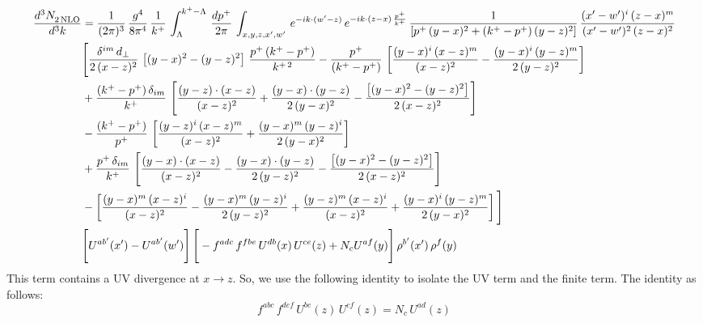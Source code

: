 \documentclass[9pt]{article}
\numberwithin{equation}{section}
\begin{document}
\begin{align}
    \frac{d^{3}N_{2\,\rm NLO}^{\rm}}{d^{3}k}  & =  \frac{1}{(2\pi)^{3}}\, \frac{g^{4}}{8\pi^{4}}\,\frac{1}{k^{+}}\,\int_{\Lambda}^{k^{+}-\Lambda}\, \frac{dp^{+}}{2\pi} \, \int_{x,y,z,x',w'}\,e^{-ik\cdot(w'-z)}\,e^{-ik\cdot (z-x)\,\frac{p^{+}}{k^{+}}}\,\frac{1}{\left[p^{+}\,(y-x)^{2}+(k^{+}-p^{+})\,(y-z)^{2}\right]}\, \frac{(x'-w')^{i}\,(z-x)^{m}}{(x'-w')^{2}\,(z-x)^{2}} \notag \\ & \Bigg[\frac{\delta^{im}\,d_{\perp}}{2\,(x-z)^{2}}\,\left[(y-x)^{2}-(y-z)^{2}\right]\,\frac{p^{+}\,(k^{+}-p^{+})}{k^{+\,2}}-\frac{p^{+}}{(k^{+}-p^{+})}\,\left[\frac{(y-x)^{i}\,(x-z)^{m}}{(x-z)^{2}}-\frac{(y-x)^{i}\,(y-z)^{m}}{2\,(y-z)^{2}}\right]\notag \\ & +\frac{(k^{+}-p^{+})\,\delta_{im}}{k^{+}}\,\left[\frac{(y-z)\cdot (x-z)}{(x-z)^{2}}+\frac{(y-x)\cdot (y-z)}{2\,(y-x)^{2}}-\frac{\left[(y-x)^{2}-(y-z)^{2}\right]}{2\,(x-z)^{2}}\right]\notag \\ & -\frac{(k^{+}-p^{+})}{p^{+}}\,\left[\frac{(y-z)^{i}\,(x-z)^{m}}{(x-z)^{2}}+\frac{(y-x)^{m}\,(y-z)^{i}}{2\,(y-x)^{2}}\right]\notag \\ & +\frac{p^{+}\,\delta_{im}}{k^{+}}\,\left[\frac{(y-x)\cdot (x-z)}{(x-z)^{2}}-\frac{(y-x)\cdot (y-z)}{2\,(y-z)^{2}}-\frac{\left[(y-x)^{2}-(y-z)^{2}\right]}{2\,(x-z)^{2}}\right]\notag \\ &-\left[\frac{(y-x)^{m}\,(x-z)^{i}}{(x-z)^{2}}-\frac{(y-x)^{m}\,(y-z)^{i}}{2\,(y-z)^{2}}+\frac{(y-z)^{m}\,(x-z)^{i}}{(x-z)^{2}}+\frac{(y-x)^{i}\,(y-z)^{m}}{2\,(y-x)^{2}}\right]\Bigg] \notag \\ & \Bigg[U^{ab'}(x')-U^{ab'}(w')\Bigg]\,\Bigg[-f^{adc}\,f^{fbe}\,U^{db}(x)\,U^{ce}(z)+N_{c}U^{af}(y)\Bigg]\,\rho^{b'}(x')\,\rho^{f}(y)
\end{align}
This term contains a UV divergence at $x\rightarrow z$.  So, we use the following identity to isolate the UV term and the finite term. The identity as follows:
$$f^{abc}\,f^{def}\,U^{be}(z)\,U^{cf}(z) = N_{c}\,U^{ad}(z)$$
\end{document}
